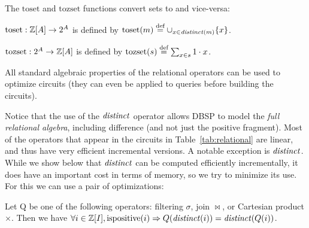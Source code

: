 The $\mbox{toset}$ and $\mbox{tozset}$ functions convert sets to \zrs and 
vice-versa:

$\mbox{toset}: \mathbb{Z}[A] \to 2^A$ is defined by $\mbox{toset}(m) \stackrel{\textrm{\scriptsize def}}{=} \cup_{x \in \mathit{distinct}(m)} \{ x \}$.

$\mbox{tozset}: 2^A \to \mathbb{Z}[A]$ is defined by $\mbox{tozset}(s) \stackrel{\textrm{\scriptsize def}}{=} \sum_{x \in s} 1 \cdot x$.

All standard algebraic properties
of the relational operators can be used to optimize circuits
(they can even be applied to queries before building the circuits).

Notice that the use of the $\mathit{distinct}$ operator allows DBSP to model
the \emph{full relational algebra}, including difference (and not just the positive
fragment).  Most of the operators that appear in the circuits in
Table~\ref{tab:relational} are linear, and thus have very efficient
incremental versions.  A notable exception is $\mathit{distinct}$.  While we
show below that $\mathit{distinct}$ can be computed efficiently incrementally,
it does have an important cost in terms of memory, so we try to 
minimize its use.  For this we can use a pair of optimizations:

\begin{proposition}\label{prop-distinct-delay}
Let Q be one of the following \zrs operators: filtering $\sigma$,
join $\bowtie$, or Cartesian product $\times$.
Then we have $\forall i \in \mathbb{Z}[I], \mbox{ispositive}(i) \Rightarrow Q(\mathit{distinct}(i)) = \mathit{distinct}(Q(i))$.
\end{proposition}

